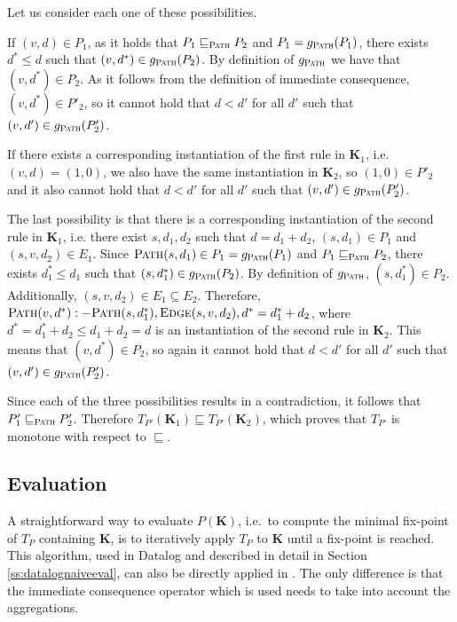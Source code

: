 \begin{exmp}
\begin{prof}
Let us consider each one of these possibilities.

If $(v, d) \in P_1$, as it holds that $P_1 \sqsubseteq_\textsc{Path} P_2$ and $P_1 = g_\textsc{Path}(P_1)$, there exists $d^* \le d$ such that $(v, d^*) \in g_\textsc{Path}(P_2)$. By definition of $g_\textsc{Path}$ we have that $(v, d^*) \in P_2$. As it follows from the definition of immediate consequence, $(v, d^*) \in P'_2$, so it cannot hold that $d < d'$ for all $d'$ such that $(v, d') \in g_\textsc{Path}(P'_2)$.

If there exists a corresponding instantiation of the first rule in $\textbf{K}_1$, i.e. $(v, d) = (1, 0)$, we also have the same instantiation in $\textbf{K}_2$, so $(1, 0) \in P'_2$ and it also cannot hold that $d < d'$ for all $d'$ such that $(v, d') \in g_\textsc{Path}(P'_2)$.

The last possibility is that there is a corresponding instantiation of the second rule in $\textbf{K}_1$, i.e. there exist $s, d_1, d_2$ such that $d = d_1 + d_2$, $(s, d_1) \in P_1$ and $(s, v, d_2) \in E_1$. Since $\textsc{Path}(s, d_1) \in P_1 = g_\textsc{Path}(P_1)$ and $P_1 \sqsubseteq_\textsc{Path} P_2$, there exists $d^*_1 \le d_1$ such that $(s, d^*_1) \in g_\textsc{Path}(P_2)$.  By definition of $g_\textsc{Path}$, $(s, d^*_1) \in P_2$. Additionally, $(s, v, d_2) \in E_1 \subseteq E_2$. Therefore, $\textsc{Path} (v, d^*) :- \textsc{Path} (s, d^*_1), \textsc{Edge} (s, v, d_2), d^* = d^*_1 + d_2$, where $d^* = d^*_1 + d_2 \le d_1 + d_2 = d$ is an instantiation of the second rule in $\textbf{K}_2$. This means that $(v, d^*) \in P_2$, so again it cannot hold that $d < d'$ for all $d'$ such that $(v, d') \in g_\textsc{Path}(P'_2)$. 

Since each of the three possibilities results in a contradiction, it follows that $P'_1 \sqsubseteq_\textsc{Path} P'_2$. Therefore $T_{P'}(\textbf{K}_1) \sqsubseteq T_{P'}(\textbf{K}_2)$, which proves that $T_{P'}$ is monotone with respect to $\sqsubseteq$.
\QEDA
\end{prof}
\end{exmp}

\subsection{Evaluation}
A straightforward way to evaluate $P(\textbf{K})$, i.e.\ to compute the minimal fix-point of $T_P$ containing $\textbf{K}$, is to iteratively apply $T_P$ to $\textbf{K}$ until a fix-point is reached. This algorithm, used in Datalog and described in detail in Section \ref{ss:datalognaiveeval}, can also be directly applied in \datalogra. The only difference is that the immediate consequence operator which is used needs to take into account the aggregations.

